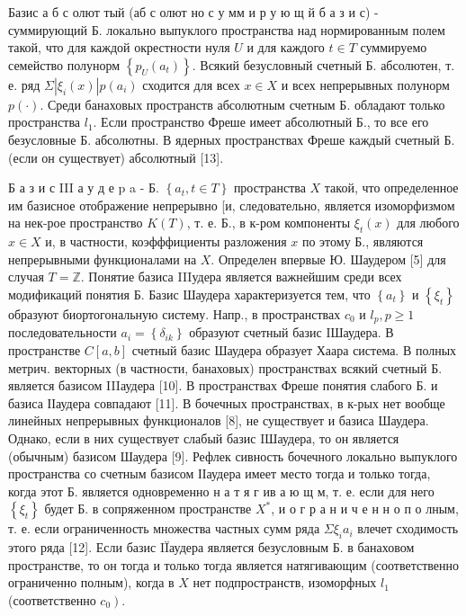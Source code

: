 \documentclass[10pt]{article}
\begin{document}
Базис а б с олют тый (аб с олют но с у мм и р у ю щ й б а з и с) - суммирующий Б. локально выпуклого пространства над нормированным полем такой, что для каждой окрестности нуля $U$ и для каждого $t \in T$ суммируемо семейство полунорм $\left\{p_{U}\left(a_{t}\right)\right\}$. Всякий безусловный счетный Б. абсолютен, т. е. ряд $\Sigma\left|\xi_{i}(x)\right| p\left(a_{i}\right)$ сходится для всех $x \in X$ и всех непрерывных полунорм $p(\cdot)$. Среди банаховых пространств абсолютным счетным Б. обладают только пространства $l_{1}$. Если пространство Фреше имеет абсолютный Б., то все его безусловные Б. абсолютны. В ядерных пространствах Фреше каждый счетный Б. (если он существует) абсолютный [13].



Б а з и с III а у д е $\mathrm{p}$ a - Б. $\left\{a_{t}, t \in T\right\}$ пространства $X$ такой, что определенное им базисное отображение непрерывно [и, следовательно, является изоморфизмом на нек-рое пространство $K(T)$, т. е. Б., в к-ром компоненты $\xi_{t}(x)$ для любого $x \in X$ и, в частности, коэфффициенты разложения $x$ по этому Б., являются непрерывными функционалами на $X$. Определен впервые Ю. Шаудером [5] для случая $T=\mathbb{Z}$. Понятие базиса IIIудера является важнейшим среди всех модификаций понятия Б. Базис Шаудера характеризуется тем, что $\left\{a_{t}\right\}$ и $\left\{\xi_{t}\right\}$ образуют биортогональную систему. Напр., в пространствах $c_{0}$ и $l_{p}, p \geqslant 1$ последовательности $a_{i}=\left\{\delta_{i k}\right\}$ образуют счетный базис IШаудера. В пространстве $C[a, b]$ счетный базис Шаудера образует Хаара система. В полных метрич. векторных (в частности, банаховых) пространствах всякий счетный Б. является базисом IIIаудера [10]. В пространствах Фреше понятия слабого Б. и базиса ІІаудера совпадают [11]. В бочечных пространствах, в к-рых нет вообще линейных непрерывных функционалов [8], не существует и базиса Шаудера. Однако, если в них существует слабый базис IШаудера, то он является (обычным) базисом Шаудера [9]. Рефлек сивность бочечного локально выпуклого пространства со счетным базисом ІІаудера имеет место тогда и только тогда, когда этот Б. является одновременно н а т я г ив а ю щ м, т. е. если для него $\left\{\xi_{t}\right\}$ будет Б. в сопряженном пространстве $X^{*}$, и о г р а н и ч е н н о п о лным, т. е. если ограниченность множества частных сумм ряда $\Sigma \xi_{i} a_{i}$ влечет сходимость этого ряда [12]. Если базис IÏаудера является безусловным Б. в банаховом пространстве, то он тогда и только тогда является натягивающим (соответственно ограниченно полным), когда в $X$ нет подпространств, изоморфных $l_{1}$ (соответственно $\left.c_{0}\right)$.
\end{document}
